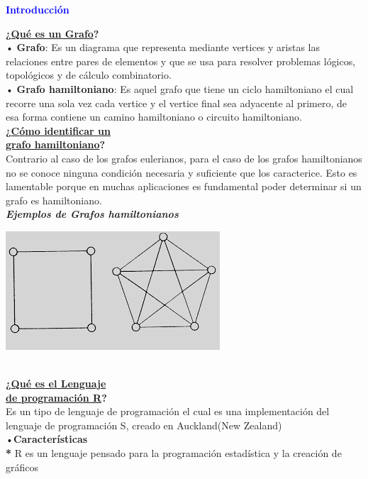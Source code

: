 \documentclass[11pt,a4paper]{article}
\begin{document}
\LARGE
\begin{center}
\textbf{\textcolor{blue}{Introducci{\'o}n}}\\[1cm]
\end{center}
\begin{multicols}{2}
\textbf{¿\underline{Qu{\'e} es un Grafo}?}\\
• \textbf{Grafo}: Es un diagrama que representa mediante vertices y aristas las relaciones entre pares de elementos y que se usa para resolver problemas l{\'o}gicos, topol{\'o}gicos y de c{\'a}lculo combinatorio.\\
• \textbf{Grafo hamiltoniano}: Es aquel grafo que tiene un ciclo hamiltoniano el cual recorre una sola vez cada vertice y el vertice final sea adyacente al primero, de esa forma contiene un camino hamiltoniano o circuito hamiltoniano.\\
\textbf{¿\underline{C{\'o}mo identificar un}}\\
\textbf{\underline{grafo hamiltoniano}?}\\
Contrario al caso de los grafos eulerianos, para el caso de los grafos hamiltonianos no se conoce ninguna condici{\'o}n necesaria y suficiente que los caracterice. Esto es lamentable porque en muchas aplicaciones es fundamental poder determinar si un grafo es hamiltoniano.\\
\textit{\textbf{Ejemplos de Grafos hamiltonianos}}\\
\begin{minipage}[c]{4cm}
\includegraphics[scale=0.42]{grafo.PNG}
\end{minipage}\\[1cm]
\textbf{¿\underline{Qu{\'e} es el Lenguaje}}\\
\textbf{\underline{de programaci{\'o}n R}?}\\
Es un tipo de lenguaje de programaci{\'o}n el cual es una implementaci{\'o}n del lenguaje de programaci{\'o}n S, creado en Auckland(New Zealand)\\
•\textbf{Caracter{\'i}sticas}\\
\textbf{*} R es un lenguaje pensado para la programaci{\'o}n estad{\'i}stica y la creaci{\'o}n de gr{\'a}ficos\\

\end{multicols}
\end{document}

